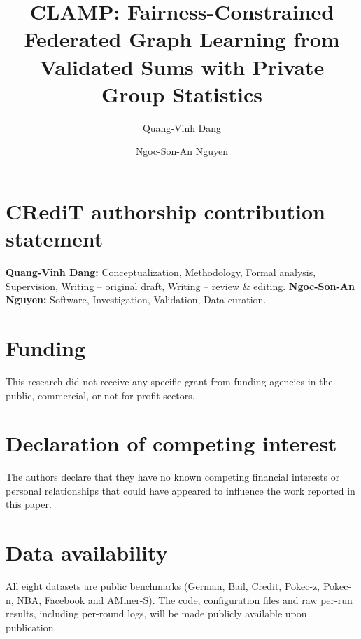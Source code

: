 \documentclass[preprint,12pt]{elsarticle}
\theoremstyle{plain}
\theoremstyle{definition}
\theoremstyle{remark}
\begin{document}
\begin{frontmatter}

\title{CLAMP: Fairness-Constrained Federated Graph Learning from Validated Sums with Private Group Statistics}

\author[inst1]{Quang-Vinh Dang}

\author[inst2]{Ngoc-Son-An Nguyen}





\end{frontmatter}











\section*{CRediT authorship contribution statement}
\textbf{Quang-Vinh Dang:} Conceptualization, Methodology, Formal analysis, Supervision, Writing -- original draft, Writing -- review \& editing.
\textbf{Ngoc-Son-An Nguyen:} Software, Investigation, Validation, Data curation.

\section*{Funding}
This research did not receive any specific grant from funding agencies in the public, commercial, or not-for-profit sectors.

\section*{Declaration of competing interest}
The authors declare that they have no known competing financial interests or personal relationships that could have appeared to influence the work reported in this paper.

\section*{Data availability}
All eight datasets are public benchmarks (German, Bail, Credit, Pokec-z, Pokec-n, NBA, Facebook and AMiner-S). The code, configuration files and raw per-run results, including per-round logs, will be made publicly available upon publication.




\end{document}
